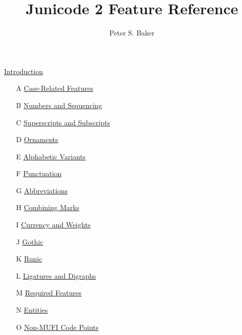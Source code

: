 \documentclass[letterpaper,12pt]{article}
\title{Junicode 2 Feature Reference}
\author{Peter S. Baker}
\newcounter{Feature}
\begin{document}
\maketitle
\thispagestyle{plain}

\hyperlink{intro}{Introduction}

\begin{itemize}
\setlength\itemsep{0em}
\item[A] \hyperlink{SectionA}{Case-}\hyperlink{SectionA}{R}\hyperlink{SectionA}{elated
}\hyperlink{SectionA}{F}\hyperlink{SectionA}{eatures}

\item[B] \hyperlink{SectionB}{Numbers and }\hyperlink{SectionB}{S}\hyperlink{SectionB}{equencing}

\item[C] \hyperlink{SectionC}{Superscripts and Subscripts}

\item[D] \hyperlink{SectionD}{Ornaments}

\item[E] \hyperlink{SectionE}{Alphabetic Variants}

\item[F] \hyperlink{SectionF}{Punctuation}

\item[G] \hyperlink{SectionG}{Abbreviations}

\item[H] \hyperlink{SectionH}{Combining Marks}

\item[I] \hyperlink{SectionI}{Currency }\hyperlink{SectionI}{and Weights}

\item[J] \hyperlink{SectionJ}{Gothic}

\item[K] \hyperlink{SectionK}{Runic}

\item[L] \hyperlink{SectionL}{Ligatures and Digraphs}

\item[M] \hyperlink{req}{Required Features}

\item[N] \hyperlink{SectionN}{Entities}

\item[O] \hyperlink{nonmufi}{Non-MUFI Code }\hyperlink{nonmufi}{Points}
\end{itemize}
\end{document}
